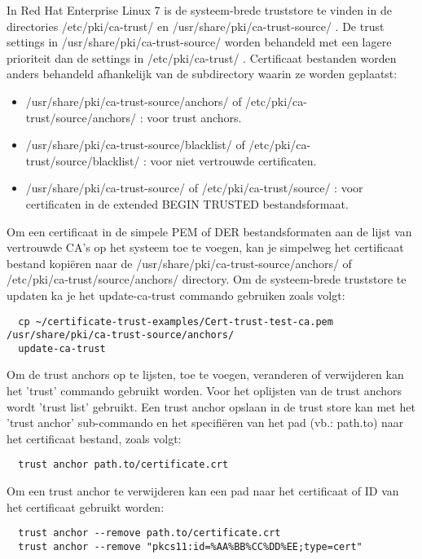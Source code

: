 In Red Hat Enterprise Linux 7 is de systeem-brede truststore te vinden in de directories /etc/pki/ca-trust/ en /usr/share/pki/ca-trust-source/ . De trust settings in /usr/share/pki/ca-trust-source/ worden behandeld met een lagere prioriteit dan de settings in /etc/pki/ca-trust/ .
Certificaat bestanden worden anders behandeld afhankelijk van de subdirectory waarin ze worden geplaatst:
\begin{itemize}
  \item /usr/share/pki/ca-trust-source/anchors/ of /etc/pki/ca-trust/source/anchors/ : voor trust anchors.
  \item /usr/share/pki/ca-trust-source/blacklist/ of /etc/pki/ca-trust/source/blacklist/ : voor niet vertrouwde certificaten.
  \item /usr/share/pki/ca-trust-source/ of /etc/pki/ca-trust/source/ : voor certificaten in de extended BEGIN TRUSTED bestandsformaat.
\end{itemize} \autocite{RHELtruststore}

Om een certificaat in de simpele PEM of DER bestandsformaten aan de lijst van vertrouwde CA's op het systeem toe te voegen, kan je simpelweg het certificaat bestand kopiëren naar de /usr/share/pki/ca-trust-source/anchors/ of /etc/pki/ca-trust/source/anchors/ directory. Om de systeem-brede truststore te updaten ka je het update-ca-trust commando gebruiken zoals volgt:
\begin{verbatim}
  cp ~/certificate-trust-examples/Cert-trust-test-ca.pem /usr/share/pki/ca-trust-source/anchors/
  update-ca-trust
\end{verbatim} 

Om de trust anchors op te lijsten, toe te voegen, veranderen of verwijderen kan het 'trust' commando gebruikt worden.
Voor het oplijsten van de trust anchors wordt 'trust list' gebruikt.
Een trust anchor opslaan in de trust store kan met het 'trust anchor' sub-commando en het specifiëren van het pad (vb.: path.to) naar het certificaat bestand, zoals volgt:
\begin{verbatim}
  trust anchor path.to/certificate.crt
\end{verbatim} 
Om een trust anchor te verwijderen kan een pad naar het certificaat of ID van het certificaat gebruikt worden:
\begin{verbatim}
  trust anchor --remove path.to/certificate.crt
  trust anchor --remove "pkcs11:id=%AA%BB%CC%DD%EE;type=cert"
\end{verbatim} 
\autocite{RHELtruststore} \break




